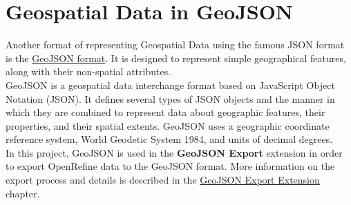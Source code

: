 \section{Geospatial Data in GeoJSON}
Another format of representing Geospatial Data using the famous JSON format is the \href{https://datatracker.ietf.org/doc/html/rfc7946}{GeoJSON format}.
It is designed to represent simple geographical features, along with their non-spatial attributes.\\
\newline
GeoJSON is a geospatial data interchange format based on JavaScript
Object Notation (JSON).  It defines several types of JSON objects and
the manner in which they are combined to represent data about
geographic features, their properties, and their spatial extents.
GeoJSON uses a geographic coordinate reference system, World Geodetic
System 1984, and units of decimal degrees. \cite{WhatIsGeoJSON}\\
\newline
In this project, GeoJSON is used in the \textbf{GeoJSON Export} extension in order to export OpenRefine data to the
GeoJSON format. More information on the export process and details is described in the \hyperref[ch:the-geojson-export-extension]{GeoJSON Export Extension} chapter.